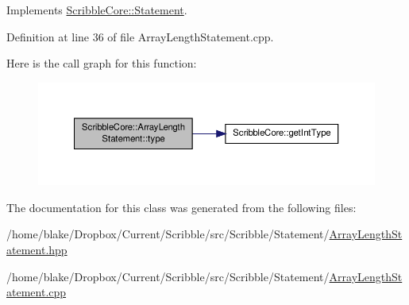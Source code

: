 Implements \hyperlink{class_scribble_core_1_1_statement_a532ed5a44ec49873dc191dae7ddc8b00}{Scribble\-Core\-::\-Statement}.



Definition at line 36 of file Array\-Length\-Statement.\-cpp.



Here is the call graph for this function\-:
\nopagebreak
\begin{figure}[H]
\begin{center}
\leavevmode
\includegraphics[width=350pt]{class_scribble_core_1_1_array_length_statement_ac7c1deececdad51dc373ce4942f99ddc_cgraph}
\end{center}
\end{figure}




The documentation for this class was generated from the following files\-:\begin{DoxyCompactItemize}
\item 
/home/blake/\-Dropbox/\-Current/\-Scribble/src/\-Scribble/\-Statement/\hyperlink{_array_length_statement_8hpp}{Array\-Length\-Statement.\-hpp}\item 
/home/blake/\-Dropbox/\-Current/\-Scribble/src/\-Scribble/\-Statement/\hyperlink{_array_length_statement_8cpp}{Array\-Length\-Statement.\-cpp}\end{DoxyCompactItemize}
